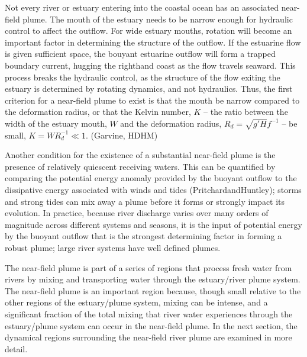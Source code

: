 \documentclass[12pt]{article}
\begin{document}


Not every river or estuary entering into the coastal ocean has an associated near-field plume. The mouth of the estuary needs to be narrow enough for hydraulic control to affect the outflow. For wide estuary mouths, rotation will become an important factor in determining the structure of the outflow. If the estuarine flow is given sufficient space, the bouyant estuarine outflow will form a trapped boundary current, hugging the righthand coast as the flow travels seaward. This process breaks the hydraulic control, as the structure of the flow exiting the estuary is determined by rotating dynamics, and not hydraulics. Thus, the first criterion for a near-field plume to exist is that the mouth be narrow compared to the deformation radius, or that the Kelvin number, $K$ -- the ratio between the width of the estuary mouth, $W$ and the deformation radius, $R_d = \sqrt{g' H} f^{-1}$ -- be small, $K = W R_d^{-1} \ll 1$. (Garvine, HDHM)

Another condition for the existence of a substantial near-field plume is the presence of relatively quiescent receiving waters. This can be quantified by comparing the potential energy anomaly provided by the buoyant outflow to the dissipative energy associated with winds and tides (PritchardandHuntley); storms and strong tides can mix away a plume before it forms or strongly impact its evolution. In practice, because river discharge varies over many orders of magnitude across different systems and seasons, it is the input of potential energy by the buoyant outflow that is the strongest determining factor in forming a robust plume; large river systems have well defined plumes.

The near-field plume is part of a series of regions that process fresh water from rivers by mixing and transporting water through the estuary/river plume system. The near-field plume is an important region because, though small relative to the other regions of the estuary/plume system, mixing can be intense, and a significant fraction of the total mixing that river water experiences through the estuary/plume system can occur in the near-field plume. In the next section, the dynamical regions surrounding the near-field river plume are examined in more detail.
\end{document}
